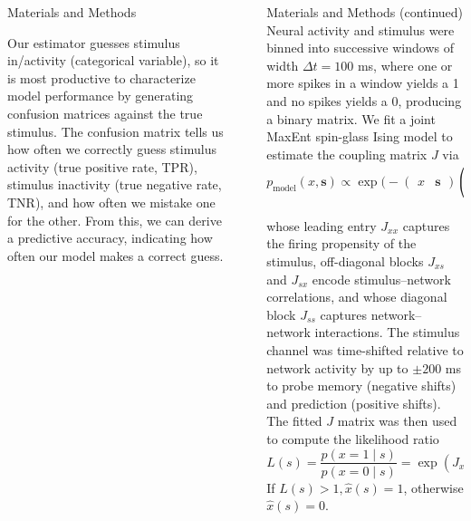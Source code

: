 \documentclass[final]{beamer}
\newlength{\sepwidth}
\newlength{\colwidth}
\newcommand{\separatorcolumn}{\begin{column}{\sepwidth}\end{column}}
\begin{document}
\begin{frame}[t]
\begin{columns}[t]
\begin{column}{\colwidth}
\begin{block}{Materials and Methods}
\vspace{2em}

Our estimator guesses stimulus in/activity (categorical variable), so it is most productive to characterize model performance by generating confusion matrices against the true stimulus. The confusion matrix tells us how often we correctly guess stimulus activity (true positive rate, TPR), stimulus inactivity (true negative rate, TNR), and how often we mistake one for the other. From this, we can derive a predictive accuracy, indicating how often our model makes a correct guess.
\end{block}
\end{column}

\separatorcolumn

\begin{column}{\colwidth}
\begin{block}{Materials and Methods (continued)}
Neural activity and stimulus were binned into successive windows of width $\Delta t = 100$ ms, where one or more spikes in a window yields a 1 and no spikes yields a 0, producing a binary matrix. We fit a joint MaxEnt spin-glass Ising model to estimate the coupling matrix $J$ via
\begin{equation}
    p_\mathrm{model}(x,\mathbf{s}) \propto \exp\bigg( -
    \begin{pmatrix}
        x & \mathbf{s}
    \end{pmatrix}
    \underbrace{
    \begin{pmatrix}
        J_{xx} & J_{xs} \\ J_{sx} & J_{ss}
    \end{pmatrix}
    }_{J}
    \begin{pmatrix}
        x \\ \mathbf{s}
    \end{pmatrix}\bigg),
\end{equation}
whose leading entry $J_{xx}$ captures the firing propensity of the stimulus, off-diagonal blocks $J_{xs}$ and $J_{sx}$ encode stimulus–network correlations, and whose diagonal block $J_{ss}$ captures network–network interactions. The stimulus channel was time-shifted relative to network activity by up to $\pm 200$ ms to probe memory (negative shifts) and prediction (positive shifts). The fitted $J$ matrix was then used to compute the likelihood ratio
\begin{equation}
    L(s) = \frac{p(x=1 \mid s)}{p(x=0 \mid s)} = \exp\left(J_{xx}+J_{xs}s+s^{\top}J_{sx}\right).
\end{equation}
If $L(s) > 1, \hat{x}(s)=1$, otherwise $\hat{x}(s)=0$.
\end{block}


\end{column}
\end{columns}
\end{frame}
\end{document}
